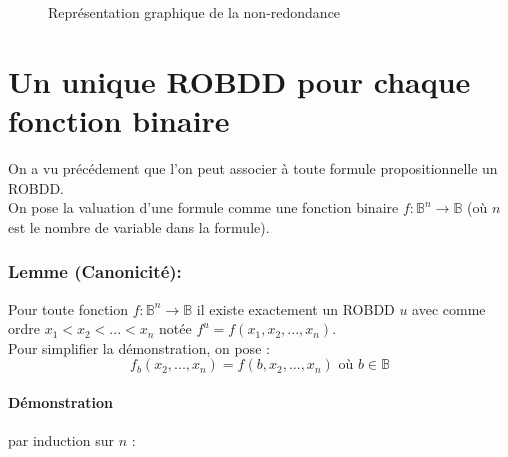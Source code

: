 \documentclass[a4paper, oneside]{report}
\begin{document}
\begin{enumerate}
\begin{figure}[h]
\caption{Représentation graphique de la non-redondance}
\end{figure}
\end{enumerate}

\section{Un unique ROBDD pour chaque fonction binaire}

\noindent On a vu précédement que l'on peut associer à toute formule propositionnelle un ROBDD.\\

\noindent On pose la valuation d'une formule comme une fonction binaire $f :\mathbb{B}^n \to \mathbb{B}$ (où $n$ est le nombre de variable dans la formule).\\

\subsubsection{Lemme (Canonicité):} 
Pour toute fonction $f :\mathbb{B}^n \to \mathbb{B}$ il existe exactement un ROBDD $u$ avec comme ordre $x_1 < x_2 < ... < x_n$ notée $f^u = f(x_1,x_2,...,x_n)$.\\

\noindent Pour simplifier la démonstration, on pose :
$$f_b(x_2,...,x_n) = f(b,x_2,...,x_n) \text{ où } b \in \mathbb{B}$$

\paragraph{Démonstration} par induction sur $n$ :\\
\end{document}

